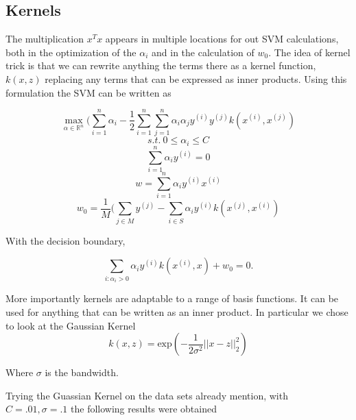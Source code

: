 \documentclass[12pt, twocolumn]{article}
\begin{document}
\subsection*{Kernels}

The multiplication $x^Tx$ appears in multiple locations for out SVM calculations, both in  the optimization of the $\alpha_i$ and in the calculation of $w_0$. The idea of kernel trick is that we can rewrite anything the terms there as a kernel function, $k(x,z)$ replacing any terms that can be expressed as inner products. Using this formulation the SVM can be written as 

\begin{equation}
\max_{\alpha \in \mathbb{R}^n} ( \sum_{i=1}^n \alpha_i - \frac{1}{2} \sum_{i=1}^n \sum_{j=1}^n \alpha_i \alpha_j y^{(i)} y^{(j)} k(x^{(i)},x^{(j)})
\end{equation}
\begin{equation}
s.t. \: 0 \leq \alpha_i \leq C
\end{equation}
\begin{equation}
\sum_{i=1}^n \alpha_i y^{(i)} =0
\end{equation}
\begin{equation}
w= \sum_{i=1}^n \alpha_i y^{(i)}x^{(i)}
\end{equation}  
\begin{equation}
w_0= \frac{1}{M} ( \sum_{j \in M} y^{(j)} - \sum_{i \in S} \alpha_i y^{(i)}k(x^{(j)},x^{(i)})
\end{equation}

With the decision boundary, 

\begin{equation}
\sum_{i:\alpha_i > 0} \alpha_i y^{(i)}k(x^{(i)}, x) + w_0 = 0.
\end{equation}

 More importantly kernels are adaptable to a range of basis functions. It can be used for anything that can be written as an inner product. In particular we chose to look at the Gaussian Kernel
 \begin{equation}
 k(x,z)= \textrm{exp}(-\frac{1}{2\sigma^2} ||x - z||_2^2)
\end{equation}

Where $\sigma$ is the bandwidth.

Trying the Guassian Kernel on the data sets already mention, with $C= .01, \sigma =.1$ the following results were obtained
\end{document}
